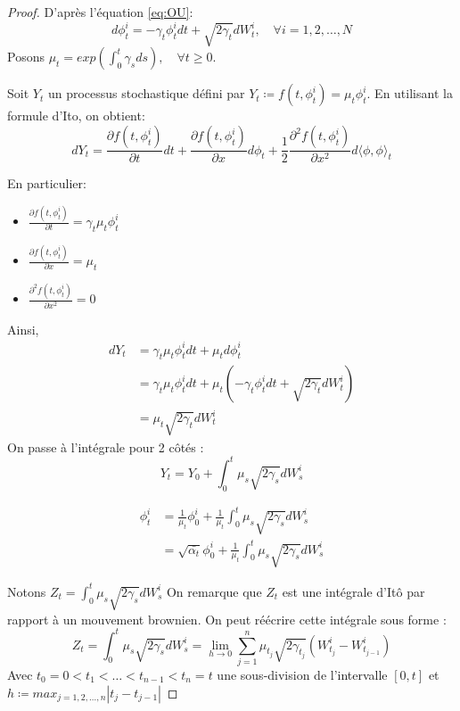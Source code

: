 \documentclass[a4paper,10pt]{article}
\theoremstyle{definition} %
\theoremstyle{definition} %
\theoremstyle{definition} %
\theoremstyle{definition} %
\begin{document}
\begin{proof}
    D'après l'équation \eqref{eq:OU}:
    \[d\phi_t^i = -\gamma_t \phi_t^i dt + \sqrt{2\gamma_t}dW_t^i, \quad \forall i=1,2,\dots,N\] 
    Posons $\mu_t = exp{\left(\int_0^t \gamma_s ds\right)}, \quad \forall t \geq 0$.
    
    Soit $Y_t$ un processus stochastique défini par $Y_t \coloneqq f(t,\phi_t^i)= \mu_t \phi_t^i$.
    En utilisant la formule d'Ito, on obtient:
    \[dY_t = \frac{\partial f(t,\phi_t^i)}{\partial t} dt + \frac{\partial f(t,\phi_t^i)}{\partial x} d\phi_t + \frac{1}{2}\frac{\partial^2f(t,\phi_t^i)}{\partial x^2}d\langle\phi,\phi\rangle_t\]

    En particulier:
    \begin{itemize}
        \item $\frac{\partial f(t,\phi_t^i)}{\partial t} = \gamma_t \mu_t \phi_t^i$
        \item $\frac{\partial f(t,\phi_t^i)}{\partial x} = \mu_t$
        \item $\frac{\partial^2f(t,\phi_t^i)}{\partial x^2}=0$
    \end{itemize}

    Ainsi,
    \begin{align*}
        dY_t &= \gamma_t \mu_t \phi_t^i dt + \mu_t d\phi_t^i\\
        &= \gamma_t \mu_t \phi_t^i dt + \mu_t (-\gamma_t \phi_t^i dt + \sqrt{2\gamma_t}dW_t^i)\\
        &= \mu_t\sqrt{2\gamma_t}dW_t^i
    \end{align*}
    On passe à l'intégrale pour 2 côtés :
    \[Y_t = Y_0 + \int_0^t \mu_s\sqrt{2\gamma_s}dW_s^i\]

    \begin{align*}
        \phi_t^i &= \frac{1}{\mu_t}\phi_0^i + \frac{1}{\mu_t} \int_0^t \mu_s\sqrt{2\gamma_s}dW_s^i \\
        &= \sqrt{\bar{\alpha_t}}\phi_0^i + \frac{1}{\mu_t} \int_0^t \mu_s\sqrt{2\gamma_s}dW_s^i
    \end{align*}

    Notons $Z_t = \int_0^t\mu_s\sqrt{2\gamma_s}dW_s^i$ On remarque que $Z_t$ est une intégrale d'Itô par rapport à un mouvement brownien. On peut réécrire cette intégrale sous forme :
    \[Z_t=\int_0^t\mu_s\sqrt{2\gamma_s}dW_s^i = \lim_{h\rightarrow 0} \sum_{j=1}^{n} \mu_{t_j}\sqrt{2\gamma_{t_j}}(W^i_{t_j}-W^i_{t_{j-1}})\]
    Avec $t_0=0 < t_1<\dots<t_{n-1} < t_{n} = t$ une sous-division de l'intervalle $[0,t]$ et $h \coloneqq max_{j = 1,2,\dots,n} |t_j - t_{j-1}|$


\end{proof}
\end{document}
